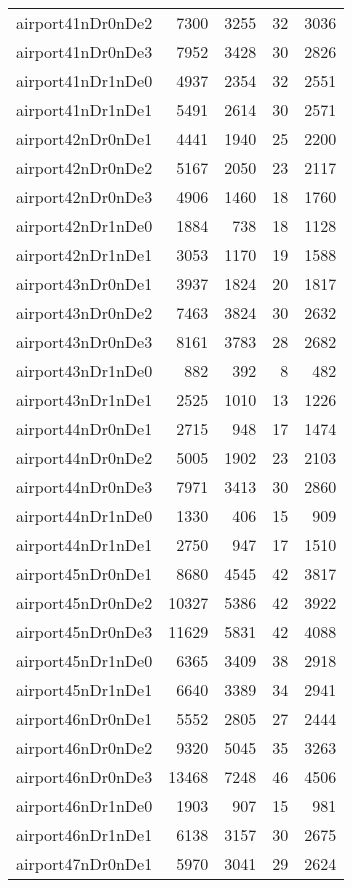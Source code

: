 \documentclass[../../../thesis.tex]{subfiles}
\begin{document}
\begin{longtable}{lrrrr}
airport41nDr0nDe2 & 7300 & 3255 & 32 & 3036 \\
airport41nDr0nDe3 & 7952 & 3428 & 30 & 2826 \\
airport41nDr1nDe0 & 4937 & 2354 & 32 & 2551 \\
airport41nDr1nDe1 & 5491 & 2614 & 30 & 2571 \\
airport42nDr0nDe1 & 4441 & 1940 & 25 & 2200 \\
airport42nDr0nDe2 & 5167 & 2050 & 23 & 2117 \\
airport42nDr0nDe3 & 4906 & 1460 & 18 & 1760 \\
airport42nDr1nDe0 & 1884 & 738 & 18 & 1128 \\
airport42nDr1nDe1 & 3053 & 1170 & 19 & 1588 \\
airport43nDr0nDe1 & 3937 & 1824 & 20 & 1817 \\
airport43nDr0nDe2 & 7463 & 3824 & 30 & 2632 \\
airport43nDr0nDe3 & 8161 & 3783 & 28 & 2682 \\
airport43nDr1nDe0 & 882 & 392 & 8 & 482 \\
airport43nDr1nDe1 & 2525 & 1010 & 13 & 1226 \\
airport44nDr0nDe1 & 2715 & 948 & 17 & 1474 \\
airport44nDr0nDe2 & 5005 & 1902 & 23 & 2103 \\
airport44nDr0nDe3 & 7971 & 3413 & 30 & 2860 \\
airport44nDr1nDe0 & 1330 & 406 & 15 & 909 \\
airport44nDr1nDe1 & 2750 & 947 & 17 & 1510 \\
airport45nDr0nDe1 & 8680 & 4545 & 42 & 3817 \\
airport45nDr0nDe2 & 10327 & 5386 & 42 & 3922 \\
airport45nDr0nDe3 & 11629 & 5831 & 42 & 4088 \\
airport45nDr1nDe0 & 6365 & 3409 & 38 & 2918 \\
airport45nDr1nDe1 & 6640 & 3389 & 34 & 2941 \\
airport46nDr0nDe1 & 5552 & 2805 & 27 & 2444 \\
airport46nDr0nDe2 & 9320 & 5045 & 35 & 3263 \\
airport46nDr0nDe3 & 13468 & 7248 & 46 & 4506 \\
airport46nDr1nDe0 & 1903 & 907 & 15 & 981 \\
airport46nDr1nDe1 & 6138 & 3157 & 30 & 2675 \\
airport47nDr0nDe1 & 5970 & 3041 & 29 & 2624 \\

\end{longtable}
\end{document}
